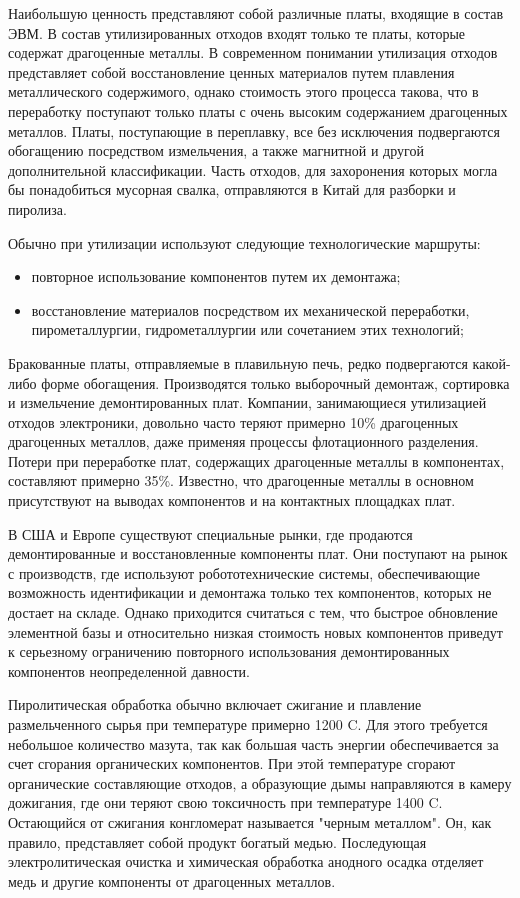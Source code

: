Наибольшую ценность представляют собой различные платы, входящие в состав ЭВМ. В состав утилизированных отходов входят только те платы, которые содержат драгоценные металлы. В современном понимании утилизация отходов представляет собой восстановление ценных материалов путем плавления металлического содержимого, однако стоимость этого процесса такова, что в переработку поступают только платы с очень высоким содержанием драгоценных металлов. Платы, поступающие в переплавку, все без исключения подвергаются обогащению посредством измельчения, а также магнитной и другой дополнительной классификации. Часть отходов, для захоронения которых могла бы понадобиться мусорная свалка, отправляются в Китай для разборки и пиролиза.

Обычно при утилизации используют следующие технологические маршруты:
\begin{itemize}
\item повторное использование компонентов путем их демонтажа;
\item восстановление материалов посредством их механической переработки, пирометаллургии, гидрометаллургии или сочетанием этих технологий;
\end{itemize}

Бракованные платы, отправляемые в плавильную печь, редко подвергаются какой-либо форме обогащения. Производятся только выборочный демонтаж, сортировка и измельчение демонтированных плат. Компании, занимающиеся утилизацией отходов электроники, довольно часто теряют примерно 10\% драгоценных драгоценных металлов, даже применяя процессы флотационного разделения. Потери при переработке плат, содержащих драгоценные металлы в компонентах, составляют примерно 35\%. Известно, что драгоценные металлы в основном присутствуют на выводах компонентов и на контактных площадках плат.

В США и Европе существуют специальные рынки, где продаются демонтированные и восстановленные компоненты плат. Они поступают на рынок с производств, где используют робототехнические системы, обеспечивающие возможность идентификации и демонтажа только тех компонентов, которых не достает на складе. Однако приходится считаться с тем, что быстрое обновление элементной базы и относительно низкая стоимость новых компонентов приведут к серьезному ограничению повторного использования демонтированных компонентов неопределенной давности.

Пиролитическая обработка обычно включает сжигание и плавление размельченного сырья при температуре примерно 1200 \textdegree C. Для этого требуется небольшое количество мазута, так как большая часть энергии обеспечивается за счет сгорания органических компонентов. При этой температуре сгорают органические составляющие отходов, а образующие дымы направляются в камеру дожигания, где они теряют свою токсичность при температуре 1400 \textdegree C. Остающийся от сжигания конгломерат называется "черным металлом". Он, как правило, представляет собой продукт богатый медью. Последующая электролитическая очистка и химическая обработка анодного осадка отделяет медь и другие компоненты от драгоценных металлов.

